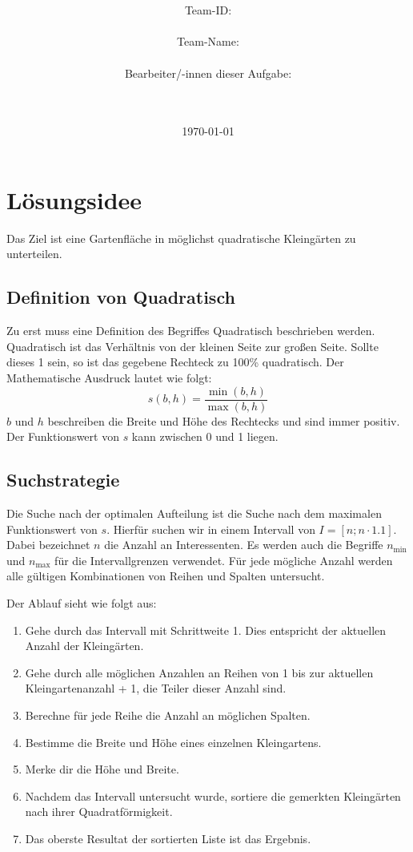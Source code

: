 \documentclass[a4paper,10pt,ngerman]{scrartcl}
\title{\textbf{\Huge\Aufgabe}}
\author{\LARGE Team-ID: \LARGE \TeamId \\\\
	    \LARGE Team-Name: \LARGE \TeamName \\\\
	    \LARGE Bearbeiter/-innen dieser Aufgabe: \\ 
	    \LARGE \Namen\\\\}
\date{\LARGE\today}
\begin{document}
\maketitle
\tableofcontents

\vspace{0.5cm}

\section{Lösungsidee}

Das Ziel ist eine Gartenfläche in möglichst quadratische Kleingärten zu unterteilen.

\subsection{Definition von Quadratisch}
Zu erst muss eine Definition des Begriffes Quadratisch beschrieben werden. Quadratisch ist das Verhältnis von der kleinen Seite zur großen Seite. Sollte dieses 1 sein, so ist das gegebene Rechteck zu 100\% quadratisch. Der Mathematische Ausdruck lautet wie folgt:
\[
s(b,h) = \frac{\min(b,h)}{\max(b,h)}
\]
$b$ und $h$ beschreiben die Breite und Höhe des Rechtecks und sind immer positiv. Der Funktionswert von $s$ kann zwischen 0 und 1 liegen.

\subsection{Suchstrategie}
Die Suche nach der optimalen Aufteilung ist die Suche nach dem maximalen Funktionswert von $s$. Hierfür suchen wir in einem Intervall von $I=[n; n \cdot 1.1]$. Dabei bezeichnet $n$ die Anzahl an Interessenten. Es werden auch die Begriffe $n_{\min}$ und $n_{\max}$ für die Intervallgrenzen verwendet. Für jede mögliche Anzahl werden alle gültigen Kombinationen von Reihen und Spalten untersucht.

Der Ablauf sieht wie folgt aus:
\begin{enumerate}
  \item Gehe durch das Intervall mit Schrittweite 1. Dies entspricht der aktuellen Anzahl der Kleingärten.
  \item Gehe durch alle möglichen Anzahlen an Reihen von 1 bis zur aktuellen Kleingartenanzahl + 1, die Teiler dieser Anzahl sind.
  \item Berechne für jede Reihe die Anzahl an möglichen Spalten.
  \item Bestimme die Breite und Höhe eines einzelnen Kleingartens.
  \item Merke dir die Höhe und Breite.
  \item Nachdem das Intervall untersucht wurde, sortiere die gemerkten Kleingärten nach ihrer Quadratförmigkeit.
  \item Das oberste Resultat der sortierten Liste ist das Ergebnis.
\end{enumerate}
\end{document}

